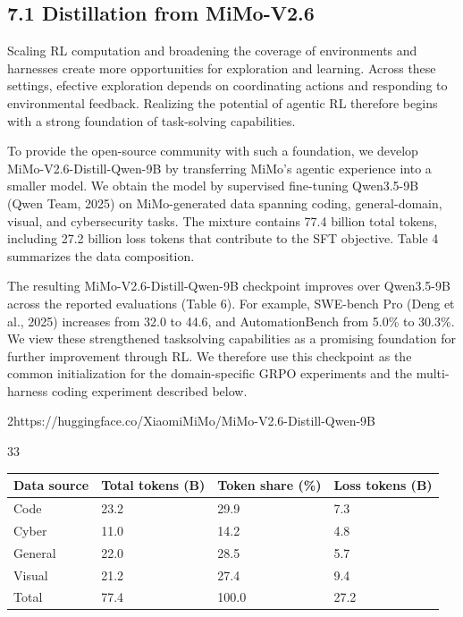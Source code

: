 \documentclass[
  10
]{article}
\newcounter{none} %
\begin{document}
\subsection{7.1 Distillation from
MiMo-V2.6}\label{distillation-from-mimo-v2.6}

Scaling RL computation and broadening the coverage of environments and
harnesses create more opportunities for exploration and learning. Across
these settings, efective exploration depends on coordinating actions and
responding to environmental feedback. Realizing the potential of agentic
RL therefore begins with a strong foundation of task-solving
capabilities.

To provide the open-source community with such a foundation, we develop
MiMo-V2.6-Distill-Qwen-9B by transferring MiMo's agentic experience into
a smaller model. We obtain the model by supervised fine-tuning
Qwen3.5-9B (Qwen Team, 2025) on MiMo-generated data spanning coding,
general-domain, visual, and cybersecurity tasks. The mixture contains
77.4 billion total tokens, including 27.2 billion loss tokens that
contribute to the SFT objective. Table 4 summarizes the data
composition.

The resulting MiMo-V2.6-Distill-Qwen-9B checkpoint improves over
Qwen3.5-9B across the reported evaluations (Table 6). For example,
SWE-bench Pro (Deng et al., 2025) increases from 32.0 to 44.6, and
AutomationBench from 5.0\% to 30.3\%. We view these strengthened
tasksolving capabilities as a promising foundation for further
improvement through RL. We therefore use this checkpoint as the common
initialization for the domain-specific GRPO experiments and the
multi-harness coding experiment described below.

2https://huggingface.co/XiaomiMiMo/MiMo-V2.6-Distill-Qwen-9B

33

{\def\LTcaptype{none} %
\begin{longtable}[]{@{}|l|l|l|l|@{}}
\toprule\noalign{}
\endhead
\bottomrule\noalign{}
\endlastfoot
\hline
Data source & Total tokens (B) & Token share (\%) & Loss tokens (B) \\
\hline
Code & 23.2 & 29.9 & 7.3 \\
\hline
Cyber & 11.0 & 14.2 & 4.8 \\
\hline
General & 22.0 & 28.5 & 5.7 \\
\hline
Visual & 21.2 & 27.4 & 9.4 \\
\hline
Total & 77.4 & 100.0 & 27.2 \\
\hline
\end{longtable}
}
\end{document}
